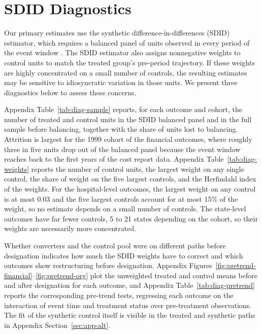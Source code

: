 \documentclass[a4paper, 12pt]{article}
\begin{document}

\section{SDID Diagnostics}
\label{sec:app-diagnostics}

Our primary estimates use the synthetic difference-in-differences (SDID) estimator, which requires a balanced panel of units observed in every period of the event window \citep{arkhangelsky2021}. The SDID estimator also assigns nonnegative weights to control units to match the treated group's pre-period trajectory. If these weights are highly concentrated on a small number of controls, the resulting estimates may be sensitive to idiosyncratic variation in those units. We present three diagnostics below to assess these concerns.

Appendix Table~\ref{tab:diag-sample} reports, for each outcome and cohort, the number of treated and control units in the SDID balanced panel and in the full sample before balancing, together with the share of units lost to balancing. Attrition is largest for the 1999 cohort of the financial outcomes, where roughly three in five units drop out of the balanced panel because the event window reaches back to the first years of the cost report data. Appendix Table~\ref{tab:diag-weights} reports the number of control units, the largest weight on any single control, the share of weight on the five largest controls, and the Herfindahl index of the weights. For the hospital-level outcomes, the largest weight on any control is at most 0.03 and the five largest controls account for at most 15\% of the weight, so no estimate depends on a small number of controls. The state-level outcomes have far fewer controls, 5 to 21 states depending on the cohort, so their weights are necessarily more concentrated.

Whether converters and the control pool were on different paths before designation indicates how much the SDID weights have to correct and which outcomes show restructuring before designation. Appendix Figures~\ref{fig:pretrend-financial}--\ref{fig:pretrend-org} plot the unweighted treated and control means before and after designation for each outcome, and Appendix Table~\ref{tab:diag-pretrend} reports the corresponding pre-trend tests, regressing each outcome on the interaction of event time and treatment status over pre-treatment observations. The fit of the synthetic control itself is visible in the treated and synthetic paths in Appendix Section~\ref{sec:app-alt}.
\end{document}
